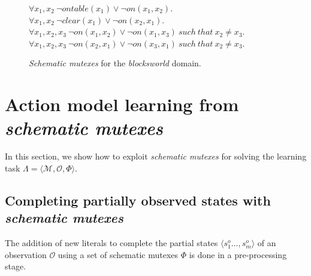 \documentclass{article}
\newcommand{\tup}[1]{{\langle #1 \rangle}}
\begin{document}
\begin{figure}[hbt!]
  \begin{footnotesize}
$\forall x_1,x_2\ \neg ontable(x_1)\vee\neg on(x_1,x_2)$.\\
$\forall x_1,x_2\ \neg clear(x_1)\vee\neg on(x_2,x_1)$.\\
$\forall x_1,x_2,x_3\ \neg on(x_1,x_2)\vee\neg on(x_1,x_3)\ such\ that\ x_2\neq x_3$.\\
$\forall x_1,x_2,x_3\ \neg on(x_2,x_1)\vee\neg on(x_3,x_1)\ such\ that\ x_2\neq x_3$.\\
\end{footnotesize}
 \caption{\small {\em Schematic mutexes} for the {\em blocksworld} domain.}
\label{fig:strongest-invariant}
\end{figure}


\section{Action model learning from {\em schematic mutexes}}
\label{sec:compilation}

In this section, we show how to exploit \emph{schematic mutexes} for solving the learning task $\Lambda=\tup{\mathcal{M},{\mathcal O},\Phi}$.


\subsection{Completing partially observed states with {\em schematic mutexes}}

The addition of new literals to complete the partial states $\tup{s_1^o \ldots, s_m^o}$ of an observation $\mathcal{O}$  using a set of schematic mutexes $\Phi$ is done in a pre-processing stage.
\end{document}
